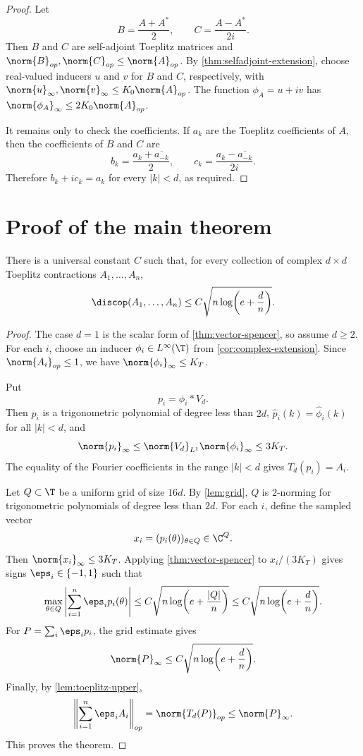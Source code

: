 \begin{proof}
Let
\[
   B=\frac{A+A^*}{2},
   \qquad
   C=\frac{A-A^*}{2i} .
\]
Then $B$ and $C$ are self-adjoint Toeplitz matrices and
$\norm{B}_{op},\norm{C}_{op}\le\norm{A}_{op}$.  By
\cref{thm:selfadjoint-extension}, choose real-valued inducers $u$ and $v$ for
$B$ and $C$, respectively, with
$\norm{u}_\infty,\norm{v}_\infty\le K_0\norm{A}_{op}$.  The function
$\phi_A=u+iv$ has $\norm{\phi_A}_\infty\le2K_0\norm{A}_{op}$.

It remains only to check the coefficients.  If $a_k$ are the Toeplitz
coefficients of $A$, then the coefficients of $B$ and $C$ are
\[
   b_k=\frac{a_k+\overline{a_{-k}}}{2},
   \qquad
   c_k=\frac{a_k-\overline{a_{-k}}}{2i} .
\]
Therefore $b_k+ic_k=a_k$ for every $|k|<d$, as required.
\end{proof}

\section{Proof of the main theorem}\label{sec:main-proof}

\begin{theorem}\label{thm:toeplitz}
There is a universal constant $C$ such that, for every collection of complex
$d\times d$ Toeplitz contractions $A_1,\ldots,A_n$,
\[
   \discop(A_1,\ldots,A_n)
   \le C\sqrt{n\log\!\left(e+\frac dn\right)} .
\]
\end{theorem}

\begin{proof}
The case $d=1$ is the scalar form of \cref{thm:vector-spencer}, so assume
$d\ge2$.  For each $i$, choose an inducer $\phi_i\in L^\infty(\T)$ from
\cref{cor:complex-extension}.  Since $\norm{A_i}_{op}\le1$, we have
$\norm{\phi_i}_\infty\le K_T$.

Put
\[
   p_i=\phi_i*V_d .
\]
Then $p_i$ is a trigonometric polynomial of degree less than $2d$,
$\widehat p_i(k)=\widehat\phi_i(k)$ for all $|k|<d$, and
\[
   \norm{p_i}_\infty\le \norm{V_d}_{L^1}\norm{\phi_i}_\infty\le3K_T .
\]
The equality of the Fourier coefficients in the range $|k|<d$ gives
$T_d(p_i)=A_i$.

Let $Q\subset\T$ be a uniform grid of size $16d$.  By \cref{lem:grid}, $Q$ is
$2$-norming for trigonometric polynomials of degree less than $2d$.  For each
$i$, define the sampled vector
\[
   x_i=(p_i(\theta))_{\theta\in Q}\in\C^Q .
\]
Then $\norm{x_i}_\infty\le3K_T$.  Applying \cref{thm:vector-spencer} to
$x_i/(3K_T)$ gives signs $\eps_i\in\{-1,1\}$ such that
\[
   \max_{\theta\in Q}\left|\sum_{i=1}^n\eps_i p_i(\theta)\right|
   \le C\sqrt{n\log\!\left(e+\frac{|Q|}{n}\right)}
   \le C\sqrt{n\log\!\left(e+\frac dn\right)} .
\]
For $P=\sum_i\eps_i p_i$, the grid estimate gives
\[
   \norm{P}_\infty\le
   C\sqrt{n\log\!\left(e+\frac dn\right)} .
\]
Finally, by \cref{lem:toeplitz-upper},
\[
   \left\|\sum_{i=1}^n\eps_i A_i\right\|_{op}
   =\norm{T_d(P)}_{op}
   \le\norm{P}_\infty .
\]
This proves the theorem.
\end{proof}

